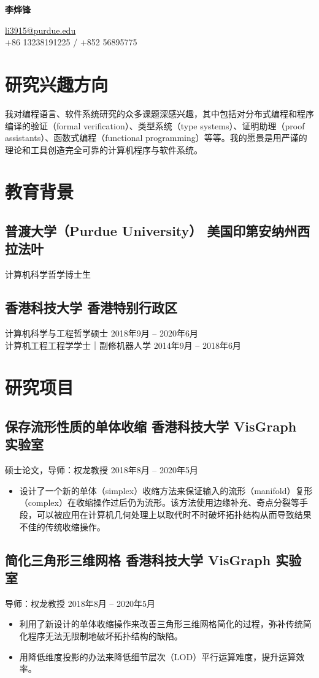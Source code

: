 \documentclass[
  10pt,           %
  autoindent=0pt, %
  scheme=plain,   %
]{ctexart}
\newcommand{\subsec}[2]{\subsection*{#1 \hfill {\normalfont #2}}}
\newcommand{\subsecdesc}[2]{{\kaishu #1 \hfill #2}}
\begin{document}
\begin{center}
{\LARGE\bfseries 李烨锋}
\vspace{4pt}

{\small\ttfamily
  \href{mailto:li3915@purdue.edu}{li3915@purdue.edu} \\
  +86 13238191225 / +852 56895775
}
\end{center}

\section*{研究兴趣方向} %

  我对编程语言、软件系统研究的众多课题深感兴趣，其中包括对分布式编程和程序编译的验证（formal verification）、类型系统（type systems）、证明助理（proof assistants）、函数式编程（functional programming）等等。我的愿景是用严谨的理论和工具创造完全可靠的计算机程序与软件系统。

\section*{教育背景} %

  \subsec{普渡大学（Purdue University）}{美国印第安纳州西拉法叶}
  \subsecdesc{计算机科学哲学博士生}{}

  \subsec{香港科技大学}{香港特别行政区}
  \subsecdesc{计算机科学与工程哲学硕士}{2018年9月 -- 2020年6月} \\
  \subsecdesc{计算机工程工程学学士｜副修机器人学}{2014年9月 -- 2018年6月}

\section*{研究项目} %

  \subsec{保存流形性质的单体收缩}{香港科技大学 VisGraph 实验室}
  \subsecdesc{硕士论文，导师：权龙教授}{2018年8月 -- 2020年5月}
  \begin{itemize}
    \item 设计了一个新的单体（simplex）收缩方法来保证输入的流形（manifold）复形（complex）在收缩操作过后仍为流形。该方法使用边缘补充、奇点分裂等手段，可以被应用在计算机几何处理上以取代时不时破坏拓扑结构从而导致结果不佳的传统收缩操作。
  \end{itemize}

  \subsec{简化三角形三维网格}{香港科技大学 VisGraph 实验室}
  \subsecdesc{导师：权龙教授}{2018年8月 -- 2020年5月}
  \begin{itemize}
    \item 利用了新设计的单体收缩操作来改善三角形三维网格简化的过程，弥补传统简化程序无法无限制地破坏拓扑结构的缺陷。
    \item 用降低维度投影的办法来降低细节层次（LOD）平行运算难度，提升运算效率。
  \end{itemize}
\end{document}
